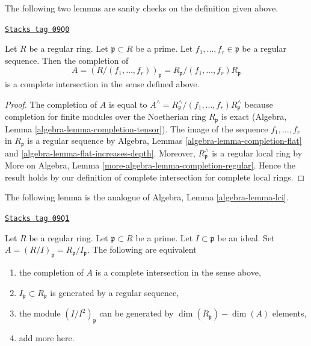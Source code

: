 The following two lemmas are sanity checks on the definition given above.

\begin{lemma}
\label{dpa-lemma-quotient-regular-ring-by-regular-sequence}
\href{https://stacks.math.columbia.edu/tag/09Q0}{\texttt{Stacks tag 09Q0}}

Let $R$ be a regular ring. Let $\mathfrak p \subset R$ be a prime.
Let $f_1, \ldots, f_r \in \mathfrak p$ be a regular sequence.
Then the completion of
$$
A = (R/(f_1, \ldots, f_r))_\mathfrak p =
R_\mathfrak p/(f_1, \ldots, f_r)R_\mathfrak p
$$
is a complete intersection in the sense defined above.
\end{lemma}

\begin{proof}
The completion of $A$ is equal to
$A^\wedge = R_\mathfrak p^\wedge/(f_1, \ldots, f_r)R_\mathfrak p^\wedge$
because completion for finite modules over the Noetherian ring
$R_\mathfrak p$ is exact
(Algebra, Lemma \ref{algebra-lemma-completion-tensor}).
The image of the sequence $f_1, \ldots, f_r$ in $R_\mathfrak p$
is a regular sequence by
Algebra, Lemmas \ref{algebra-lemma-completion-flat} and
\ref{algebra-lemma-flat-increases-depth}.
Moreover, $R_\mathfrak p^\wedge$ is a regular local ring by
More on Algebra, Lemma \ref{more-algebra-lemma-completion-regular}.
Hence the result holds by our definition of complete
intersection for complete local rings.
\end{proof}

The following lemma is the analogue of Algebra, Lemma \ref{algebra-lemma-lci}.

\begin{lemma}
\label{dpa-lemma-quotient-regular-ring}
\href{https://stacks.math.columbia.edu/tag/09Q1}{\texttt{Stacks tag 09Q1}}

Let $R$ be a regular ring. Let $\mathfrak p \subset R$ be a prime.
Let $I \subset \mathfrak p$ be an ideal.
Set $A = (R/I)_\mathfrak p = R_\mathfrak p/I_\mathfrak p$.
The following are equivalent
\begin{enumerate}
\item the completion of $A$
is a complete intersection in the sense above,
\item $I_\mathfrak p \subset R_\mathfrak p$ is generated
by a regular sequence,
\item the module $(I/I^2)_\mathfrak p$ can be generated by
$\dim(R_\mathfrak p) - \dim(A)$ elements,
\item add more here.
\end{enumerate}
\end{lemma}

